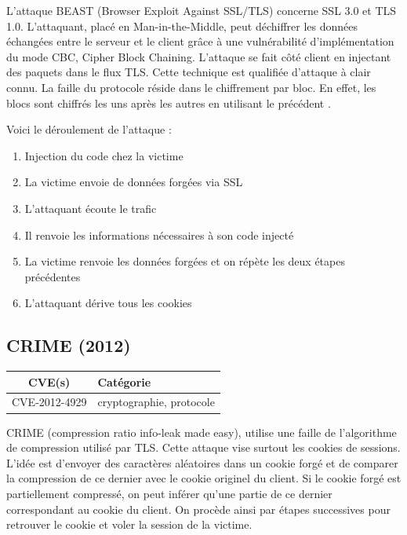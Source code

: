 L'attaque BEAST (Browser Exploit Against SSL/TLS) concerne SSL 3.0 et TLS 1.0. L'attaquant, placé en Man-in-the-Middle, peut déchiffrer les données échangées entre le serveur et le client grâce à une vulnérabilité d'implémentation du mode CBC, Cipher Block Chaining. L'attaque se fait côté client en injectant des paquets dans le flux TLS. Cette technique est qualifiée d'attaque à clair connu. La faille du protocole réside dans le chiffrement par bloc. En effet, les blocs sont chiffrés les uns après les autres en utilisant le précédent \cite{beast}.

Voici le déroulement de l'attaque :

\begin{enumerate}
\item Injection du code chez la victime
\item La victime envoie de données forgées via SSL
\item L'attaquant écoute le trafic
\item Il renvoie les informations nécessaires à son code injecté
\item La victime renvoie les données forgées et on répète les deux étapes précédentes
  \item L'attaquant dérive tous les cookies
\end{enumerate}



\subsection{CRIME (2012)}

\begin{tabularx}{0.96\textwidth}{|c|X|}
  \hline
  \textbf{CVE(s)} & \textbf{Catégorie} \\
  \hline
  CVE-2012-4929 & cryptographie, protocole \\
  \hline
\end{tabularx}

\vspace{1em}

CRIME (compression ratio info-leak made easy), utilise une faille de l'algorithme de compression utilisé par TLS. Cette attaque vise surtout les cookies de sessions. L'idée est d'envoyer des caractères aléatoires dans un cookie forgé et de comparer la compression de ce dernier avec le cookie originel du client. Si le cookie forgé est partiellement compressé, on peut inférer qu'une partie de ce dernier correspondant au cookie du client. On procède ainsi par étapes successives pour retrouver le cookie et voler la session de la victime.

